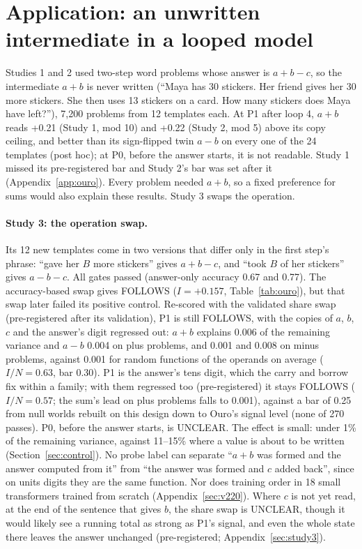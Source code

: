 \documentclass{article}
\begin{document}
\section{Application: an unwritten intermediate in a looped model}\label{sec:ouro}

Studies 1 and 2 used two-step word problems whose answer is $a+b-c$, so the intermediate $a+b$ is never written (``Maya has 30 stickers. Her friend gives her 30 more stickers. She then uses 13 stickers on a card. How many stickers does Maya have left?''), 7,200 problems from 12 templates each. At P1 after loop 4, $a+b$ reads +0.21 (Study 1, mod 10) and +0.22 (Study 2, mod 5) above its copy ceiling, and better than its sign-flipped twin $a-b$ on every one of the 24 templates (post hoc); at P0, before the answer starts, it is not readable. Study 1 missed its pre-registered bar and Study 2's bar was set after it (Appendix~\ref{app:ouro}). Every problem needed $a+b$, so a fixed preference for sums would also explain these results. Study 3 swaps the operation.

\paragraph{Study 3: the operation swap.} Its 12 new templates come in two versions that differ only in the first step's phrase: ``gave her $B$ more stickers'' gives $a+b-c$, and ``took $B$ of her stickers'' gives $a-b-c$. All gates passed (answer-only accuracy 0.67 and 0.77). The accuracy-based swap gives FOLLOWS ($I = +0.157$, Table~\ref{tab:ouro}), but that swap later failed its positive control. Re-scored with the validated share swap (pre-registered after its validation), P1 is still FOLLOWS, with the copies of $a$, $b$, $c$ and the answer's digit regressed out: $a+b$ explains 0.006 of the remaining variance and $a-b$ 0.004 on plus problems, and 0.001 and 0.008 on minus problems, against 0.001 for random functions of the operands on average ($I/N = 0.63$, bar 0.30). P1 is the answer's tens digit, which the carry and borrow fix within a family; with them regressed too (pre-registered) it stays FOLLOWS ($I/N = 0.57$; the sum's lead on plus problems falls to 0.001), against a bar of 0.25 from null worlds rebuilt on this design down to Ouro's signal level (none of 270 passes). P0, before the answer starts, is UNCLEAR. The effect is small: under 1\% of the remaining variance, against 11--15\% where a value is about to be written (Section~\ref{sec:control}). No probe label can separate ``$a+b$ was formed and the answer computed from it'' from ``the answer was formed and $c$ added back'', since on units digits they are the same function. Nor does training order in 18 small transformers trained from scratch (Appendix~\ref{sec:v220}). Where $c$ is not yet read, at the end of the sentence that gives $b$, the share swap is UNCLEAR, though it would likely see a running total as strong as P1's signal, and even the whole state there leaves the answer unchanged (pre-registered; Appendix~\ref{sec:study3}).
\end{document}
